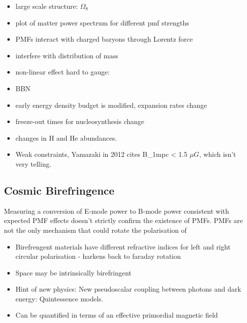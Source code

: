 \begin{itemize}
\item large scale structure: $\Omega_8$
\item plot of matter power spectrum for different pmf strengths
\item PMFs interact with charged baryons through Lorentz force
\item interfere with distribution of mass
\item non-linear effect hard to gauge:

\item BBN
\item early energy density budget is modified, expansion rates change
\item freeze-out times for nucleosynthesis change
\item changes in H and He abundances.
\item Weak constraints, Yamazaki in 2012 cites B_1mpc < 1.5 $\mu G$, which isn't very telling.
\end{itemize}

\subsection{Cosmic Birefringence}
Measuring a conversion of E-mode power to B-mode power consistent with expected PMF effects doesn't strictly confirm the existence of PMFs. PMFs are not the only mechanism that could rotate the polarisation of 
\begin{itemize}
\item Birefrengent materials have different refractive indices for left and right circular polarisation - harkens back to faraday rotation
\item Space may be intrinsically birefringent
\item Hint of new physics: New pseudoscalar coupling between photons and dark energy: Quintessence models.
\item Can be quantified in terms of an effective primordial magnetic field
\end{itemize}



